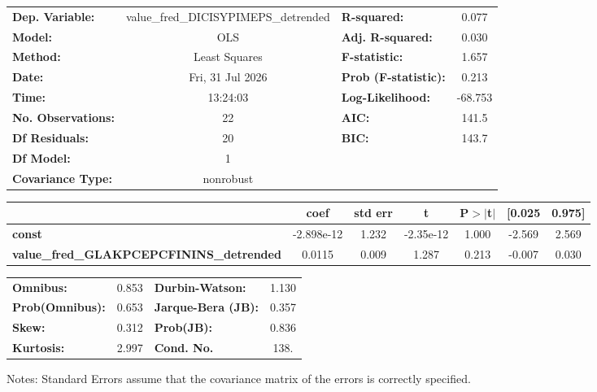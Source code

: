 \begin{center}
\begin{tabular}{lclc}
\toprule
\textbf{Dep. Variable:}                          & value\_fred\_DICISYPIMEPS\_detrended & \textbf{  R-squared:         } &     0.077   \\
\textbf{Model:}                                  &                 OLS                  & \textbf{  Adj. R-squared:    } &     0.030   \\
\textbf{Method:}                                 &            Least Squares             & \textbf{  F-statistic:       } &     1.657   \\
\textbf{Date:}                                   &           Fri, 31 Jul 2026           & \textbf{  Prob (F-statistic):} &    0.213    \\
\textbf{Time:}                                   &               13:24:03               & \textbf{  Log-Likelihood:    } &   -68.753   \\
\textbf{No. Observations:}                       &                    22                & \textbf{  AIC:               } &     141.5   \\
\textbf{Df Residuals:}                           &                    20                & \textbf{  BIC:               } &     143.7   \\
\textbf{Df Model:}                               &                     1                & \textbf{                     } &             \\
\textbf{Covariance Type:}                        &              nonrobust               & \textbf{                     } &             \\
\bottomrule
\end{tabular}
\begin{tabular}{lcccccc}
                                                 & \textbf{coef} & \textbf{std err} & \textbf{t} & \textbf{P$> |$t$|$} & \textbf{[0.025} & \textbf{0.975]}  \\
\midrule
\textbf{const}                                   &   -2.898e-12  &        1.232     & -2.35e-12  &         1.000        &       -2.569    &        2.569     \\
\textbf{value\_fred\_GLAKPCEPCFININS\_detrended} &       0.0115  &        0.009     &     1.287  &         0.213        &       -0.007    &        0.030     \\
\bottomrule
\end{tabular}
\begin{tabular}{lclc}
\textbf{Omnibus:}       &  0.853 & \textbf{  Durbin-Watson:     } &    1.130  \\
\textbf{Prob(Omnibus):} &  0.653 & \textbf{  Jarque-Bera (JB):  } &    0.357  \\
\textbf{Skew:}          &  0.312 & \textbf{  Prob(JB):          } &    0.836  \\
\textbf{Kurtosis:}      &  2.997 & \textbf{  Cond. No.          } &     138.  \\
\bottomrule
\end{tabular}
\end{center}

Notes: \newline
 [1] Standard Errors assume that the covariance matrix of the errors is correctly specified.